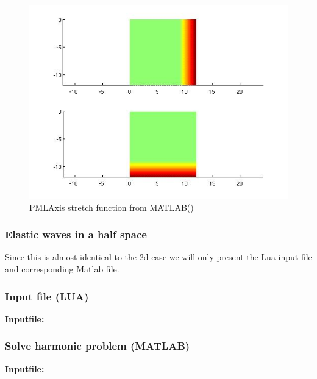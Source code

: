 \begin{figure}[htbp]
\begin{minipage}{0.45\linewidth}
    \includegraphics[width=\linewidth]{fig/pmlaxis_stretch_matlab.jpg}
    \caption{PMLAxis stretch function from MATLAB()}
    \label{fig:PMLAxisStretchFunctionMATLAB}
  \end{minipage}
\end{figure}


\clearpage
\subsubsection{Elastic waves in a half space}
Since this is almost identical to the 2d case we
will only present the Lua input file and corresponding 
Matlab file. 

\clearpage
\subsubsection*{Input file (LUA)}
\begin{flushleft}
  \textbf{Inputfile:}
  \\
\end{flushleft}
\hspace{1in}
{\footnotesize
{}
}

\clearpage
\subsubsection*{Solve harmonic problem (MATLAB)}
\begin{flushleft}
  \textbf{Inputfile:}
  \\
\end{flushleft}
\hspace{1in}
{\footnotesize
{}
}


